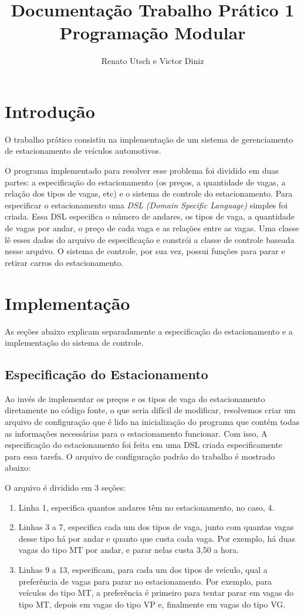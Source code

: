 \documentclass{article}
\author{Renato Utsch e Victor Diniz}
\title{Documentação Trabalho Prático 1\\Programação Modular}
\begin{document}
\maketitle

\section{Introdução}
O trabalho prático consistiu na implementação de um sistema de gerenciamento de estacionamento de veículos automotivos.

O programa implementado para resolver esse problema foi dividido em duas partes: a especificação do estacionamento (os preços, a quantidade de vagas, a relação dos tipos de vagas, etc) e o sistema de controle do estacionamento. Para especificar o estacionamento uma \emph{DSL (Domain Specific Language)} simples foi criada. Essa DSL especifica o número de andares, os tipos de vaga, a quantidade de vagas por andar, o preço de cada vaga e as relações entre as vagas. Uma classe lê esses dados do arquivo de especificação e constrói a classe de controle baseada nesse arquivo. O sistema de controle, por sua vez, possui funções para parar e retirar carros do estacionamento.

\section{Implementação}
As seções abaixo explicam separadamente a especificação do estacionamento e a implementação do sistema de controle.

\subsection{Especificação do Estacionamento}
Ao invés de implementar os preços e os tipos de vaga do estacionamento diretamente no código fonte, o que seria difícil de modificar, resolvemos criar um arquivo de configuração que é lido na inicialização do programa que contém todas as informações necessárias para o estacionamento funcionar. Com isso, 
A especificação do estacionamento foi feita em uma DSL criada especificamente para essa tarefa. O arquivo de configuração padrão do trabalho é mostrado abaixo:



O arquivo é dividido em 3 seções:
\begin{enumerate}
    \item Linha 1, especifica quantos andares têm no estacionamento, no caso, 4.
    \item Linhas 3 a 7, especifica cada um dos tipos de vaga, junto com quantas vagas desse tipo há por andar e quanto que custa cada vaga. Por exemplo, há duas vagas do tipo MT por andar, e parar nelas custa 3,50 a hora.
    \item Linhas 9 a 13, especificam, para cada um dos tipos de veículo, qual a preferência de vagas para parar no estacionamento. Por exemplo, para veículos do tipo MT, a preferência é primeiro para tentar parar em vagas do tipo MT, depois em vagas do tipo VP e, finalmente em vagas do tipo VG.
\end{enumerate}
\end{document}
